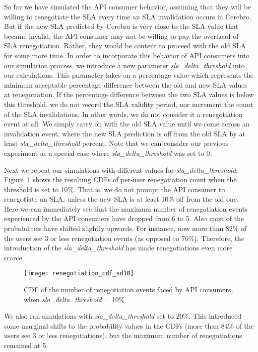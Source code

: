 So far we have simulated the API consumer behavior, assuming that they will be willing to renegotiate the
SLA every time an SLA invalidation occurs in Cerebro. But if the new SLA predicted by Cerebro is very
close to the SLA value that became invalid, the API consumer may not be willing to pay the overhead of
SLA renegotiation. Rather, they would be content to proceed with the old SLA for some more time. In order
to incorporate this behavior of API consumers into our simulation process, we introduce a new parameter 
\textit{sla\_delta\_threshold} into our calculations. This parameter takes on a percentage value which
represents the minimum acceptable percentage difference between the old and new SLA values at renegotiation.
If the percentage difference between the two SLA values is below this threshold, we do not record the
SLA validity period, nor increment the count of the SLA invalidations. In other words, we do not consider
it a renegotiation event at all. We simply carry on with the
old SLA value until we come across an invalidation event, where the new SLA prediction is off from the
old SLA by at least \textit{sla\_delta\_threshold} percent. Note that we can consider our previous experiment
as a special case where \textit{sla\_delta\_threshold} was set to 0.

Next we repeat our simulations with different values for \textit{sla\_delta\_threshold}. Figure~\ref{fig:renegotiation_cdf_sd10}
shows the resulting CDFs of per-user renegotiation count when the threshold is set to 10\%. That is, we 
do not prompt the API consumer to renegotiate an SLA, unless the new SLA is at least 10\% off from the old one.
Here we can immediately see that the maximum number of renegotiation events experienced by the API
consumers have dropped from 6 to 5. Also most of the probabilities have shifted slightly upwards. For instance,
now more than 82\% of the users see 3 or less renegotiation events (as opposed to 76\%). Therefore, the 
introduction of the \textit{sla\_delta\_threshold} has made renegotiations even more scarce.

\begin{figure}
\centering
\texttt{[image: renegotiation\_cdf\_sd10]}
\caption{CDF of the number of renegotiation events faced by API consumers, when  \textit{sla\_delta\_threshold} = 10\%}
\label{fig:renegotiation_cdf_sd10}
\vspace{-0.2in}
\end{figure}

We also ran simulations with \textit{sla\_delta\_threshold} set to 20\%. This introduced some marginal 
shifts to the probability values in the CDFs (more than 84\% of the users see 3 or less renegotiations), 
but the maximum number of renegotiations remained at 5.

